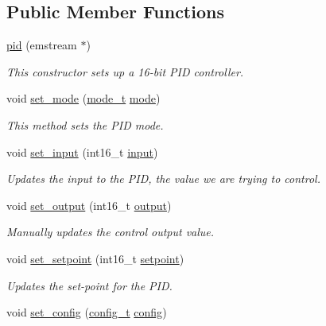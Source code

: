 \subsection*{Public Member Functions}
\begin{DoxyCompactItemize}
\item 
\hyperlink{classpid_ae23b02fef4dc3008c53dd87d898f3eff}{pid} (emstream $\ast$)
\begin{DoxyCompactList}\small\item\em This constructor sets up a 16-\/bit P\-I\-D controller. \end{DoxyCompactList}\item 
void \hyperlink{classpid_a56146496ee1acb961defceee95b7d0ce}{set\-\_\-mode} (\hyperlink{classpid_a22af7b8da10bf9878ae85f6a90991054}{mode\-\_\-t} \hyperlink{classpid_ae300b76b8ca84b4e1f31500d843b61c5}{mode})
\begin{DoxyCompactList}\small\item\em This method sets the P\-I\-D mode. \end{DoxyCompactList}\item 
void \hyperlink{classpid_aed4673f6646f44b2ee10564ad03d5033}{set\-\_\-input} (int16\-\_\-t \hyperlink{classpid_a496c88939ef50c0f0664a1d184d6b103}{input})
\begin{DoxyCompactList}\small\item\em Updates the input to the P\-I\-D, the value we are trying to control. \end{DoxyCompactList}\item 
void \hyperlink{classpid_ae2b2fdf0933f9d62a7cb10042296c91a}{set\-\_\-output} (int16\-\_\-t \hyperlink{classpid_a3954e25d8e47ad0b6e748d2e5b3680ff}{output})
\begin{DoxyCompactList}\small\item\em Manually updates the control output value. \end{DoxyCompactList}\item 
void \hyperlink{classpid_a3d06be98332b1bdef6175a56dae019c2}{set\-\_\-setpoint} (int16\-\_\-t \hyperlink{classpid_abed7eadc6bfaee99b3d5ba374a4a8389}{setpoint})
\begin{DoxyCompactList}\small\item\em Updates the set-\/point for the P\-I\-D. \end{DoxyCompactList}\item 
void \hyperlink{classpid_a7f092a6e847b3d3ec2b35161a1c1a933}{set\-\_\-config} (\hyperlink{classpid_a13d711458f38f6f9e39baa39a6353a1f}{config\-\_\-t} \hyperlink{structpid_1_1config}{config})

\end{DoxyCompactItemize}
